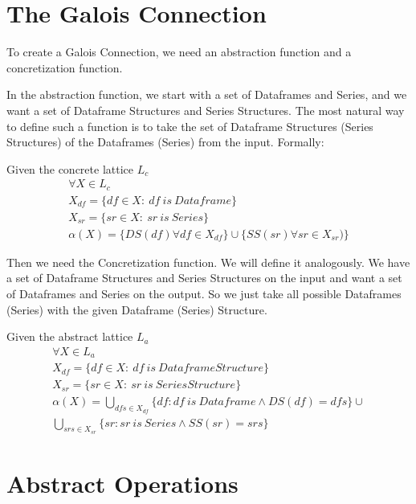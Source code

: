 \section{The Galois Connection}

To create a Galois Connection, we need an abstraction function and a concretization function.

In the abstraction function, we start with a set of Dataframes and Series, and we want a set of Dataframe Structures and
Series Structures.
The most natural way to define such a function is to take the set of Dataframe Structures (Series Structures) of the
Dataframes (Series) from the input.
Formally:

\begin{defn}
    Given the concrete lattice $L_c$
    \begin{gather*}
        \forall X \in L_c \\
        X_{df} = \{df \in X: \: df \: is \: Dataframe\} \\
        X_{sr} = \{sr \in X: \: sr \: is \: Series\} \\
        \alpha(X) = \{DS(df) \forall df \in X_{df}\} \cup \{SS(sr) \forall sr \in X_{sr})\}
    \end{gather*}
\end{defn}

Then we need the Concretization function.
We will define it analogously.
We have a set of Dataframe Structures and Series Structures on the input and want a set of Dataframes and Series
on the output.
So we just take all possible Dataframes (Series) with the given Dataframe (Series) Structure.

\begin{defn}
    Given the abstract lattice $L_a$
    \begin{gather*}
        \forall X \in L_a \\
        X_{df} = \{df \in X: \: df \: is \: Dataframe Structure\} \\
        X_{sr} = \{sr \in X: \: sr \: is \: Series Structure\} \\
        \alpha(X) =
        \bigcup_{dfs \in X_{df}}  \{df: df \: is \: Dataframe \land DS(df) = dfs\}
        \cup \\
        \bigcup_{srs \in X_{sr}} \{sr: sr \: is \: Series \land SS(sr) = srs\}
    \end{gather*}
\end{defn}

\section{Abstract Operations}

